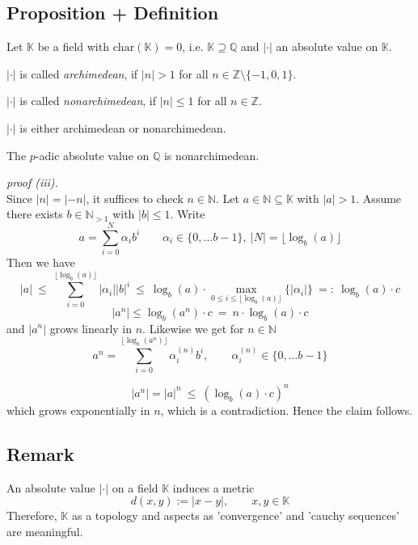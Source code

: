 \documentclass[12pt]{book}
\begin{document}
\begin{spacing}{1.3}
\subsection{Proposition + Definition} %
Let $\mathbb{K}$ be a field with $\textrm{char}(\mathbb{K})=0$, i.e. $\mathbb{K}\supseteq \mathbb{Q}$ and $|\cdot |$ an absolute value on $\mathbb{K}$. 
\begin{compactenum}
\item $|\cdot|$ is called \textit{archimedean}, if $|n|>1$ for all $n \in \mathbb{Z}\setminus \{-1,0,1\}$.
\item $|\cdot|$ is called \textit{nonarchimedean}, if $|n| \leqslant 1$ for all $n \in \mathbb{Z}$.
\item $|\cdot |$ is either archimedean or nonarchimedean.
\item The $p$-adic absolute value on $\mathbb{Q}$ is nonarchimedean.
\end{compactenum}
\textit{proof (iii).}\\
Since $|n|=|-n|$, it suffices to check $n \in \mathbb{N}$.
Let $a \in \mathbb{N} \subseteq \mathbb{K}$ with $|a|>1$. Assume there exists $b \in \mathbb{N}_{>1}$ with $|b| \leqslant 1$. Write
$$a= \sum_{i=0}^N \alpha_i b^{i} \qquad \alpha_i \in \{0, \ldots b-1\}, \ |N|=\lfloor \log_b(a) \rfloor$$
Then we have 
$$|a| \ \leqslant\ \sum_{i=0}^{\lfloor \log_b(a)\rfloor} |\alpha_i | |b|^{i} \ \leqslant\ \log_b(a) \cdot \max_{0 \leqslant i \leqslant \lfloor \log_b(a) \rfloor}\{|\alpha_i|\}\ =:\ \log_b(a) \cdot c$$
$$|a^n|\leqslant \log_b(a^n) \cdot c \ = \ n \cdot \log_b(a) \cdot c$$
and $|a^n|$ grows linearly in $n$. Likewise we get for $n \in \mathbb{N}$
$$a^n= \sum_{i=0}^{\lfloor \log_b(a^n) \rfloor} \alpha_i^{(n)} b^{i}, \qquad \alpha_i^{(n)} \in \{0, \ldots b-1\}$$



$$|a^n|=|a|^n\ \leqslant \ \left(\log_b(a) \cdot c\right)^n$$
which grows exponentially in $n$, which is a contradiction. Hence the claim follows.

\subsection{Remark} %
An absolute value $|\cdot|$ on a field $\mathbb{K}$ induces a metric
$$d(x,y):=|x-y|, \qquad x,y \in \mathbb{K}$$
Therefore, $\mathbb{K}$ as a topology and aspects as 'convergence' and 'cauchy sequences' are meaningful.


\end{spacing}
\end{document}
